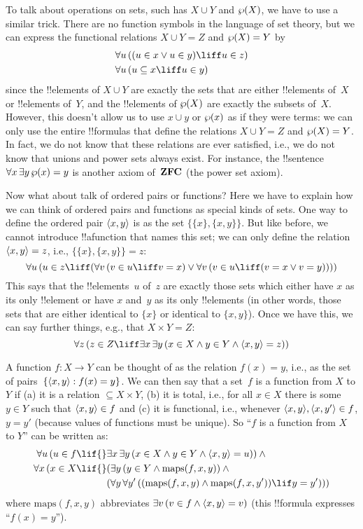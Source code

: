\documentclass[../../../include/open-logic-section]{subfiles}
\begin{document}
To talk about operations on sets, such has $X \cup Y$ and $\wp(X)$, we
have to use a similar trick.  There are no function symbols in the
language of set theory, but we can express the functional relations $X
\cup Y = Z$ and $\wp(X) = Y$ by
\begin{align*}
& \lforall[u][((u \in x \lor u \in y) \liff u \in z)]\\
& \lforall[u][(u \subseteq x \liff u \in y )]
\end{align*}
since the !!{element}s of $X \cup Y$ are exactly the sets that are
either !!{element}s of~$X$ or !!{element}s of~$Y$, and the
!!{element}s of $\wp(X)$ are exactly the subsets of~$X$.  However,
this doesn't allow us to use $x \cup y$ or $\wp(x)$ as if they were
terms: we can only use the entire !!{formula}s that define the
relations $X \cup Y = Z$ and $\wp(X) = Y$. In fact, we do not know
that these relations are ever satisfied, i.e., we do not know that
unions and power sets always exist. For instance, the !!{sentence}
$\lforall[x][\lexists[y][\Pow{x} = y]]$ is another axiom
of~$\Log{ZFC}$ (the power set axiom).

Now what about talk of ordered pairs or functions?  Here we have to
explain how we can think of ordered pairs and functions as special
kinds of sets.  One way to define the ordered pair $\langle x, y \rangle$ is
as the set $\{\{x\}, \{x, y\}\}$.  But like before, we cannot
introduce !!a{function} that names this set; we can only define the
relation $\langle x, y \rangle = z$, i.e., $\{\{x\}, \{x, y\}\} = z$:
\[
\lforall[u][(u \in z \liff (\lforall[v][(v \in u \liff v = x)] \lor
  \lforall[v][(v \in u \liff (v = x \lor v = y))]))]
\]
This says that the !!{element}s~$u$ of~$z$ are exactly those sets which
either have $x$ as its only !!{element} or have $x$ and~$y$ as its
only !!{element}s (in other words, those sets that are either identical
to $\{x\}$ or identical to $\{x, y\}$).  Once we have this, we can say
further things, e.g., that $X \times Y = Z$:
\[
\lforall[z][(z \in Z \liff \lexists[x][\lexists[y][(x \in
        X \land y \in Y \land \tuple{x, y} = z)]])]
\]

A function $f \colon X \to Y$ can be thought of as the relation $f(x)
= y$, i.e., as the set of pairs~$\{ \langle x,y \rangle : f(x) = y \}$. We
can then say that a set~$f$ is a function from $X$ to $Y$ if (a) it is
a relation $\subseteq X \times Y$, (b) it is total, i.e., for all $x
\in X$ there is some $y \in Y$ such that $\langle x, y \rangle \in f$ and (c)
it is functional, i.e., whenever $\langle x, y \rangle, \langle x, y' \rangle \in f$,
$y = y'$ (because values of functions must be unique). So ``$f$ is a
function from $X$ to $Y$'' can be written as:
\begin{align*}
 \lforall[u][(u \in f \lif {}] & \lexists[x][\lexists[y][(x \in X \land y \in
      Y \land \tuple{x, y} = u)]]) \land {}\\
 \lforall[x][(x \in X \lif {}] &
      (\lexists[y][(y \in Y \land \mathrm{maps}(f, x, y))] \land {}\\
& (\lforall[y][\lforall[y'][((\mathrm{maps}(f, x, y) \land
    \mathrm{maps}(f, x, y')) \lif y = y')]]))
\end{align*}
where $\mathrm{maps}(f, x, y)$ abbreviates $\lexists[v][(v \in f \land
  \tuple{x, y} = v)]$ (this !!{formula} expresses ``$f(x) = y$'').
\end{document}
